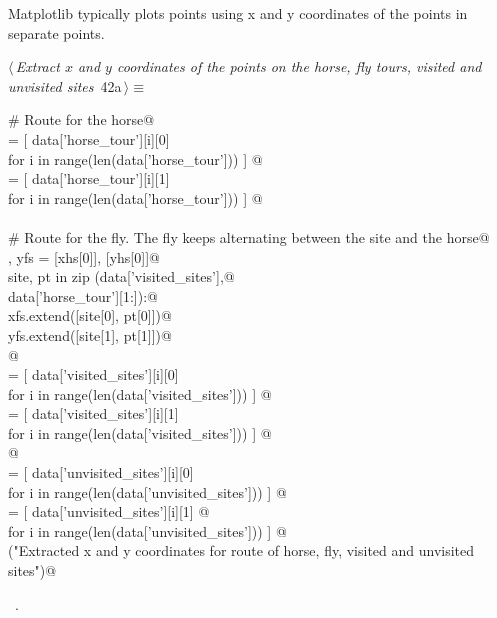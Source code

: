 \documentclass[11.5pt]{report}
\begin{document}
\vspace{-0.8cm}\newchunk Matplotlib typically plots points using x and y coordinates of the points in separate points. 

\begin{flushleft} \small\label{scrap53}\raggedright\small
{} $\langle\,${\itshape Extract $x$ and $y$ coordinates of the points on the horse, fly tours, visited and unvisited sites}\nobreak\ {\footnotesize {42a}}$\,\rangle\equiv$
\vspace{-1ex}
\begin{list}{}{} \item
\mbox{}\verb@# Route for the horse@\\
\mbox{}\verb@xhs = [ data['horse_tour'][i][0] \@\\
\mbox{}\verb@          for i in range(len(data['horse_tour']))  ]    @\\
\mbox{}\verb@yhs = [ data['horse_tour'][i][1] \@\\
\mbox{}\verb@          for i in range(len(data['horse_tour']))  ]    @\\
\mbox{}\verb@@\\
\mbox{}\verb@# Route for the fly. The fly keeps alternating between the site and the horse@\\
\mbox{}\verb@xfs , yfs = [xhs[0]], [yhs[0]]@\\
\mbox{}\verb@for site, pt in zip (data['visited_sites'],@\\
\mbox{}\verb@                     data['horse_tour'][1:]):@\\
\mbox{}\verb@    xfs.extend([site[0], pt[0]])@\\
\mbox{}\verb@    yfs.extend([site[1], pt[1]])@\\
\mbox{}\verb@        @\\
\mbox{}\verb@xvisited = [ data['visited_sites'][i][0] \@\\
\mbox{}\verb@               for i in range(len(data['visited_sites']))  ]    @\\
\mbox{}\verb@yvisited = [ data['visited_sites'][i][1] \@\\
\mbox{}\verb@               for i in range(len(data['visited_sites']))  ]    @\\
\mbox{}\verb@    @\\
\mbox{}\verb@xunvisited = [ data['unvisited_sites'][i][0] \@\\
\mbox{}\verb@                 for i in range(len(data['unvisited_sites']))  ]    @\\
\mbox{}\verb@yunvisited = [ data['unvisited_sites'][i][1] @\\
\mbox{}\verb@                 for i in range(len(data['unvisited_sites'])) ]    @\\
\mbox{}\verb@debug("Extracted x and y coordinates for route of horse, fly, visited and unvisited sites")@\\
\mbox{}\verb@@{\NWsep}
\end{list}
\vspace{-1.5ex}
\footnotesize
\begin{list}{}{\setlength{\itemsep}{-\parsep}\setlength{\itemindent}{-\leftmargin}}
\item \NWtxtMacroRefIn\ .


\end{list}
\end{flushleft}
\end{document}
